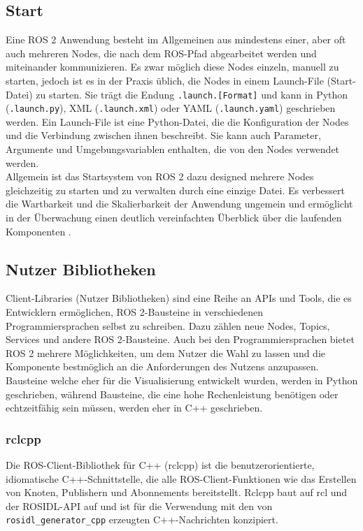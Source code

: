 \subsection{Start}\label{subsec:ROS2Start}
Eine \ac{ROS} 2 Anwendung besteht im Allgemeinen aus mindestens einer, aber oft auch mehreren Nodes, die nach dem \ac{ROS}-Pfad abgearbeitet werden und miteinander kommunizieren. Es zwar möglich diese Nodes einzeln, manuell zu starten, jedoch ist es in der Praxis üblich, die Nodes in einem Launch-File (Start-Datei) zu starten. Sie trägt die Endung \texttt{.launch.[Format]} und kann in Python (\texttt{.launch.py}), \ac{XML} (\texttt{.launch.xml}) oder \ac{YAML} (\texttt{.launch.yaml}) geschrieben werden. Ein Launch-File ist eine Python-Datei, die die Konfiguration der Nodes und die Verbindung zwischen ihnen beschreibt. Sie kann auch Parameter, Argumente und Umgebungsvariablen enthalten, die von den Nodes verwendet werden.
\\

\noindent
Allgemein ist das Startsystem von \ac{ROS} 2 dazu designed mehrere Nodes gleichzeitig zu starten und zu verwalten durch eine einzige Datei. Es verbessert die Wartbarkeit und die Skalierbarkeit der Anwendung ungemein und ermöglicht in der Überwachung einen deutlich vereinfachten Überblick über die laufenden Komponenten \cite{ROSLaunch}.\\

\subsection{Nutzer Bibliotheken}\label{subsec:ROS2NutzerBibliotheken}
Client-Libraries (Nutzer Bibliotheken) sind eine Reihe an \ac{API}s und Tools, die es Entwicklern ermöglichen, \ac{ROS} 2-Bausteine in verschiedenen Programmiersprachen selbst zu schreiben. Dazu zählen neue Nodes, Topics, Services und andere \ac{ROS} 2-Bausteine. Auch bei den Programmiersprachen bietet \ac{ROS} 2 mehrere Möglichkeiten, um dem Nutzer die Wahl zu lassen und die Komponente bestmöglich an die Anforderungen des Nutzens anzupassen. Bausteine welche eher für die Visualisierung entwickelt wurden, werden in Python geschrieben, während Bausteine, die eine hohe Rechenleistung benötigen oder echtzeitfähig sein müssen, werden eher in C++ geschrieben.\\

\subsubsection{rclcpp}\label{subsubsec:ROS2rclcpp}
Die \ac{ROS}-Client-Bibliothek für C++ (rclcpp) ist die benutzerorientierte, idiomatische C++-Schnittstelle, die alle \ac{ROS}-Client-Funktionen wie das Erstellen von Knoten, Publishern und Abonnements bereitstellt. Rclcpp baut auf \ac{rcl} und der \ac{ROS}\ac{IDL}-\ac{API} auf und ist für die Verwendung mit den von \texttt{rosidl\_generator\_cpp} erzeugten C++-Nachrichten konzipiert.
\\

